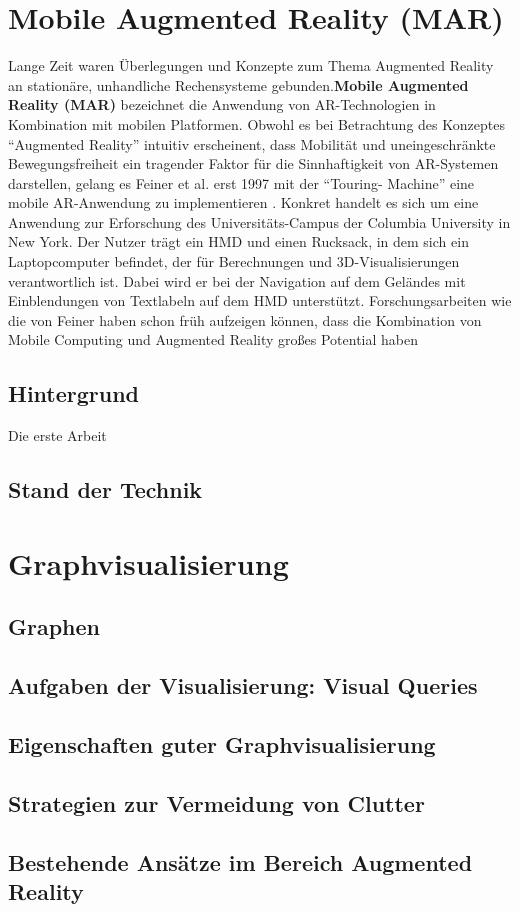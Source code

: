 \section{Mobile Augmented Reality (MAR)}
\label{sec:sota:mar}
Lange Zeit waren Überlegungen und Konzepte zum Thema Augmented Reality an stationäre, unhandliche Rechensysteme gebunden.\textbf{Mobile Augmented Reality (MAR)} bezeichnet die Anwendung von AR-Technologien in Kombination mit mobilen Platformen. Obwohl es bei Betrachtung des Konzeptes ``Augmented Reality'' intuitiv erscheinent, dass Mobilität und uneingeschränkte Bewegungsfreiheit ein tragender Faktor für die Sinnhaftigkeit von AR-Systemen darstellen, gelang es Feiner et al. erst 1997 mit der ``Touring- Machine'' eine mobile AR-Anwendung zu implementieren \cite{Feiner1997}. Konkret handelt es sich um eine Anwendung zur Erforschung des Universitäts-Campus der Columbia University in New York. Der Nutzer trägt ein HMD und einen Rucksack, in dem sich ein Laptopcomputer befindet, der für Berechnungen und 3D-Visualisierungen verantwortlich ist. Dabei wird er bei der Navigation auf dem Geländes mit Einblendungen von Textlabeln auf dem HMD unterstützt. Forschungsarbeiten wie die von Feiner haben schon früh aufzeigen können, dass die Kombination von Mobile Computing und Augmented Reality großes Potential haben

\subsection{Hintergrund}
Die erste Arbeit 
\subsection{Stand der Technik}

\Blindtext[3][2]


\section{Graphvisualisierung}
\label{sec:sota:visualization}
\subsection{Graphen}
\subsection{Aufgaben der Visualisierung: Visual Queries}
\subsection{Eigenschaften guter Graphvisualisierung}
\subsection{Strategien zur Vermeidung von Clutter}
\subsection{Bestehende Ansätze im Bereich Augmented Reality}
\Blindtext[2][1]
